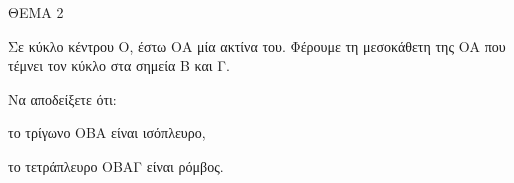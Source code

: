 
ΘΕΜΑ 2

Σε κύκλο κέντρου Ο, έστω ΟΑ μία ακτίνα του. Φέρουμε τη μεσοκάθετη της ΟΑ που τέμνει τον κύκλο στα σημεία Β και Γ.

Να αποδείξετε ότι:

\begin{alist}
\item το τρίγωνο ΟΒΑ είναι ισόπλευρο, 

\item το τετράπλευρο ΟΒΑΓ είναι ρόμβος. 
\end{alist}
